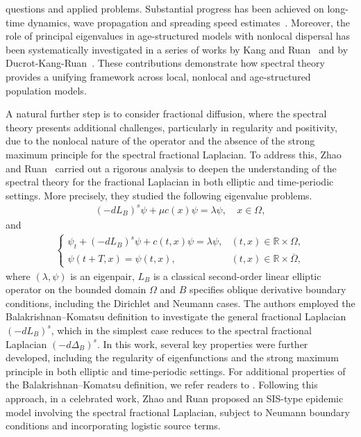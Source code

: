 \documentclass[a4paper,11pt]{amsart}
\theoremstyle{definition}
\def\O{\Omega}
\numberwithin{equation}{section}
\theoremstyle{definition}
\def\O{\Omega}
\begin{document}
questions and applied problems. Substantial progress has been achieved on long-time dynamics, wave propagation and spreading speed estimates~\cite{weinberger_1982,weinberger_lewis_li_2002,xu_spatial_2021,vo_ta_vudo_propagation}. Moreover, the role of principal eigenvalues in age-structured models with nonlocal dispersal has been systematically investigated in a series of works by Kang and Ruan~\cite{kang_principal_2022,kang_principal_2023} and by Ducrot-Kang-Ruan~\cite{ducrot_age_2024,ducrot_age-structured_2024}. These contributions demonstrate how spectral theory provides a unifying framework across local, nonlocal and age-structured population models.

A natural further step is to consider fractional diffusion, where the spectral theory presents additional challenges, particularly in regularity and positivity, due to the nonlocal nature of the operator and the absence of the strong maximum principle for the spectral fractional Laplacian. To address this, Zhao and Ruan~\cite{zhao_spatiotemporal_2025} carried out a rigorous analysis to deepen the understanding of the spectral theory for the fractional Laplacian in both elliptic and time-periodic settings. More precisely, they studied the following eigenvalue problems.
\begin{align*}
(-dL_B)^s \psi + \mu c(x)\psi = \lambda \psi, 
&~ x\in \Omega,
\end{align*}
and
\begin{align*}
\left\{
\begin{array}{ll}
\psi_t + (-dL_B)^s \psi + c(t,x)\psi = \lambda \psi, 
& (t,x)\in \mathbb{R}\times \Omega, \\
\psi(t+T,x) = \psi(t,x), 
& (t,x)\in \mathbb{R}\times \overline{\Omega},
\end{array}
\right.
\end{align*}
where $(\lambda,\psi)$ is an eigenpair, $L_B$ is a classical second-order linear elliptic operator on the bounded domain $\O$ and $B$ specifies oblique derivative boundary conditions, including the Dirichlet and Neumann cases. The authors employed the Balakrishnan–Komatsu definition to investigate the general fractional Laplacian $(-dL_B)^s$, which in the simplest case reduces to the spectral fractional Laplacian $(-d\Delta_B)^s$. In this work, several key properties were further developed, including the regularity of eigenfunctions and the strong maximum principle in both elliptic and time-periodic settings. For additional properties of the Balakrishnan–Komatsu definition, we refer readers to \cite{kato_1976,pazy_1983,ducrot_magal_prevost_2010}. Following this approach, in a celebrated work, Zhao and Ruan \cite{zhao_spatiotemporal_2023} proposed an SIS-type epidemic model involving the spectral fractional Laplacian, subject to Neumann boundary conditions and incorporating logistic source terms.
\end{document}
